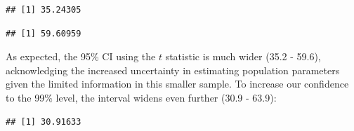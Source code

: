 \documentclass[]{book}
\newenvironment{Shaded}{\begin{snugshade}}{\end{snugshade}}
\newcommand{\CommentTok}[1]{\textcolor[rgb]{0.56,0.35,0.01}{\textit{#1}}}
\newcommand{\DecValTok}[1]{\textcolor[rgb]{0.00,0.00,0.81}{#1}}
\newcommand{\FloatTok}[1]{\textcolor[rgb]{0.00,0.00,0.81}{#1}}
\newcommand{\KeywordTok}[1]{\textcolor[rgb]{0.13,0.29,0.53}{\textbf{#1}}}
\newcommand{\NormalTok}[1]{#1}
\newcommand{\OperatorTok}[1]{\textcolor[rgb]{0.81,0.36,0.00}{\textbf{#1}}}
\newcommand{\StringTok}[1]{\textcolor[rgb]{0.31,0.60,0.02}{#1}}
\begin{document}
\begin{Shaded}
\end{Shaded}

\begin{verbatim}
## [1] 35.24305
\end{verbatim}

\begin{Shaded}
\end{Shaded}

\begin{verbatim}
## [1] 59.60959
\end{verbatim}

As expected, the 95\% CI using the \(t\) statistic is much wider (35.2 - 59.6), acknowledging the increased uncertainty in estimating population parameters given the limited information in this smaller sample. To increase our confidence to the 99\% level, the interval widens even further (30.9 - 63.9):

\begin{Shaded}
\end{Shaded}

\begin{Shaded}
\end{Shaded}

\begin{verbatim}
## [1] 30.91633
\end{verbatim}
\end{document}
